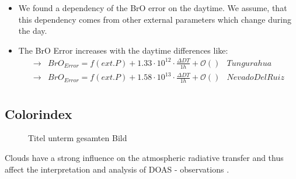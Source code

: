 \documentclass  [
  paper    = a4,
  BCOR     = 10mm,
  twoside,
  fontsize = 12pt,
  fleqn,
  toc      = bibnumbered,
  toc      = listofnumbered,
  numbers  = noendperiod,
  headings = normal,
  listof   = leveldown,
  version  = 3.03
]                                       {scrreprt}
\begin{document}
	\begin{itemize}
		\item We found a dependency of the BrO error on the daytime. We assume, that this dependency comes from other external parameters which change during the day. 
		\item The BrO Error increases with the daytime differences like: \\
		\begin{align*}
		\rightarrow&  BrO_{Error} = f(ext. P)+1.33\cdot10^{12}\cdot\frac{\Delta DT}{1h}  + \mathcal{O}\left(\right)& Tungurahua\\
		\rightarrow&  BrO_{Error} = f(ext. P)+1.58\cdot10^{13}\cdot\frac{\Delta DT}{1h} + \mathcal{O}\left(\right) & Nevado Del Ruiz\\
		\end{align*}
		
	\end{itemize}
	\subsection{Colorindex}
	\begin{figure}[h]		
		\caption{Titel unterm gesamten Bild}
		\label{fig:diffcolidx}
	\end{figure}
	Clouds  have  a  strong  influence  on  the  atmospheric  radiative  transfer  and  thus  affect  the  interpretation  and  analysis of DOAS - observations \cite{wagner2014cloud}.
	
\end{document}
